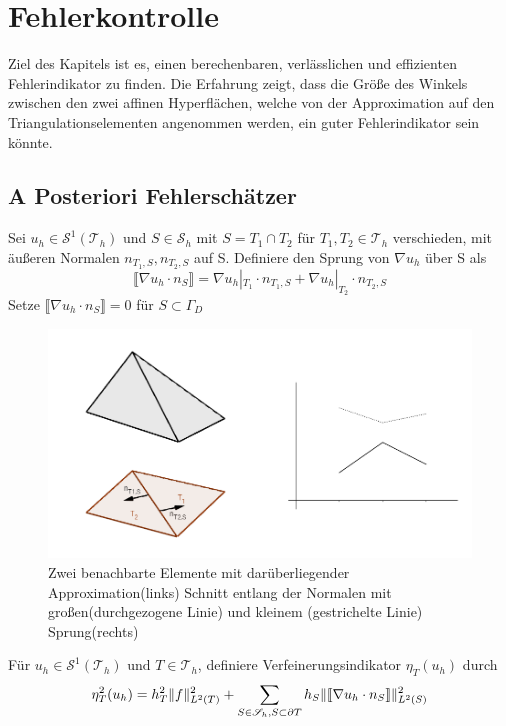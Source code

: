 \chapter{Fehlerkontrolle}
Ziel des Kapitels ist es, einen berechenbaren, verlässlichen und effizienten Fehlerindikator zu finden. Die Erfahrung zeigt, dass die Größe des Winkels zwischen den zwei affinen Hyperflächen, welche von der Approximation auf den Triangulationselementen angenommen werden, ein guter Fehlerindikator sein könnte. 

\section{A Posteriori Fehlerschätzer}
\begin{definition}[Sprung]
	Sei $u_h\in\mathscr{S}^1(\mathscr{T}_h)$ und $S\in\mathscr{S}_h$ mit $S=T_1 \cap T_2$ für $T_1,T_2 \in \mathscr{T}_h$ verschieden, mit äußeren Normalen $n_{T_1,S},n_{T_2,S}$ auf S. Definiere den Sprung von $\nabla u_h$ über S als
	\[
	\llbracket \nabla u_h \cdot n_S\rrbracket = \nabla u_h|_{T_1} \cdot n_{T_1,S} + \nabla u_h|_{T_2} \cdot n_{T_2,S}
	\]
	Setze $\llbracket \nabla u_h \cdot n_S\rrbracket = 0$ f\"ur $S\subset \Gamma_D$
\end{definition}
\begin{figure}[!htbp]
	\begin{center}
		\includegraphics[width=16cm]{pics/Sprung.png}
	\end{center}
	\caption{Zwei benachbarte Elemente mit darüberliegender Approximation(links) Schnitt entlang der Normalen mit großen(durchgezogene Linie) und kleinem (gestrichelte Linie) Sprung(rechts)}
\end{figure}
\begin{definition}[Verfeinerungsindikator]
	Für $u_h \in \mathscr{S}^1(\mathscr{T}_h) \text{ und } T \in \mathscr{T}_h$, definiere Verfeinerungsindikator $\eta_T(u_h)$ durch
	\[
	\eta^2_T(u_h) = h^2_T\|f\|^2_{L^2(T)} + \sum_{S\in\mathscr{S}_h,S\subset\partial T} h_S\|\llbracket \nabla u_h \cdot n_S\rrbracket\|^2_{L^2(S)} \]
\end{definition}
